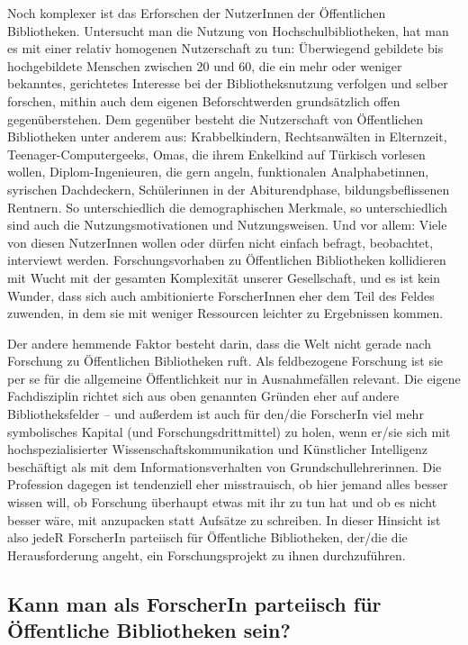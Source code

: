 \documentclass[a4paper,
fontsize=11pt,
oneside,
numbers=noperiodatend,
parskip=half-,
bibliography=totoc,
final
]{scrartcl}
\begin{document}
Noch komplexer ist das Erforschen der NutzerInnen der Öffentlichen
Bibliotheken. Untersucht man die Nutzung von Hochschulbibliotheken, hat
man es mit einer relativ homogenen Nutzerschaft zu tun: Überwiegend
gebildete bis hochgebildete Menschen zwischen 20 und 60, die ein mehr
oder weniger bekanntes, gerichtetes Interesse bei der Bibliotheksnutzung
verfolgen und selber forschen, mithin auch dem eigenen Beforschtwerden
grundsätzlich offen gegenüberstehen. Dem gegenüber besteht die
Nutzerschaft von Öffentlichen Bibliotheken unter anderem aus:
Krabbelkindern, Rechtsanwälten in Elternzeit, Teenager-Computergeeks,
Omas, die ihrem Enkelkind auf Türkisch vorlesen wollen,
Diplom-Ingenieuren, die gern angeln, funktionalen Analphabetinnen,
syrischen Dachdeckern, Schülerinnen in der Abiturendphase,
bildungsbeflissenen Rentnern. So unterschiedlich die demographischen
Merkmale, so unterschiedlich sind auch die Nutzungsmotivationen und
Nutzungsweisen. Und vor allem: Viele von diesen NutzerInnen wollen oder
dürfen nicht einfach befragt, beobachtet, interviewt werden.
Forschungsvorhaben zu Öffentlichen Bibliotheken kollidieren mit Wucht
mit der gesamten Komplexität unserer Gesellschaft, und es ist kein
Wunder, dass sich auch ambitionierte ForscherInnen eher dem Teil des
Feldes zuwenden, in dem sie mit weniger Ressourcen leichter zu
Ergebnissen kommen.

Der andere hemmende Faktor besteht darin, dass die Welt nicht gerade
nach Forschung zu Öffentlichen Bibliotheken ruft. Als feldbezogene
Forschung ist sie per se für die allgemeine Öffentlichkeit nur in
Ausnahmefällen relevant. Die eigene Fachdisziplin richtet sich aus oben
genannten Gründen eher auf andere Bibliotheksfelder -- und außerdem ist
auch für den/die ForscherIn viel mehr symbolisches Kapital (und
Forschungsdrittmittel) zu holen, wenn er/sie sich mit
hochspezialisierter Wissenschaftskommunikation und Künstlicher
Intelligenz beschäftigt als mit dem Informationsverhalten von
Grundschullehrerinnen. Die Profession dagegen ist tendenziell eher
misstrauisch, ob hier jemand alles besser wissen will, ob Forschung
überhaupt etwas mit ihr zu tun hat und ob es nicht besser wäre, mit
anzupacken statt Aufsätze zu schreiben. In dieser Hinsicht ist also
jedeR ForscherIn parteiisch für Öffentliche Bibliotheken, der/die die
Herausforderung angeht, ein Forschungsprojekt zu ihnen durchzuführen.

\hypertarget{kann-man-als-forscherin-parteiisch-fuxfcr-uxf6ffentliche-bibliotheken-sein}{%
\subsection{Kann man als ForscherIn parteiisch für Öffentliche
Bibliotheken
sein?}\label{kann-man-als-forscherin-parteiisch-fuxfcr-uxf6ffentliche-bibliotheken-sein}}
\end{document}
